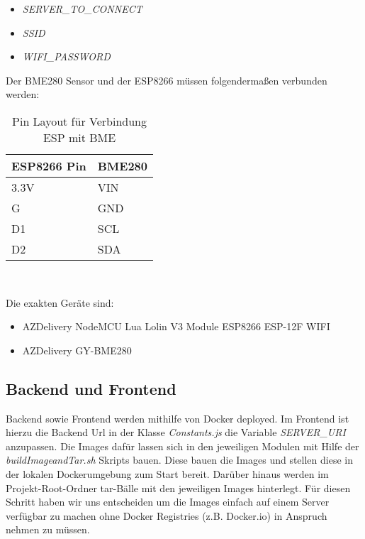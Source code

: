 \begin{itemize}
	\item \textit{SERVER\_TO\_CONNECT}
	\item \textit{SSID}
	\item \textit{WIFI\_PASSWORD}
\end{itemize}

Der BME280 Sensor und der ESP8266 müssen folgendermaßen verbunden werden:

\begin{table}[hbt]
	\centering
	\begin{minipage}[t]{.5\textwidth}
		\caption{Pin Layout für Verbindung ESP mit BME}
	\begin{tabular}{|l|l|}
		\hline
		\textbf{ESP8266 Pin}	& \textbf{BME280}  \\
		\hline
		3.3V & VIN \\
		\hline
		G & GND \\
		\hline
		D1 & SCL \\
		\hline
		D2 & SDA \\
		\hline
	\end{tabular}
	\\
\label{tab:espBmePinout}
\end{minipage}
\end{table}

Die exakten Geräte sind:

\begin{itemize}
	\item AZDelivery NodeMCU Lua Lolin V3 Module ESP8266 ESP-12F WIFI
	\item AZDelivery GY-BME280
\end{itemize}

\subsection{Backend und Frontend}

Backend sowie Frontend werden mithilfe von Docker deployed. Im Frontend ist hierzu die Backend Url in der Klasse \textit{Constants.js} die Variable \textit{SERVER\_URI} anzupassen. Die Images dafür lassen sich in den jeweiligen Modulen mit Hilfe der \textit{buildImageandTar.sh} Skripts bauen. Diese bauen die Images und stellen diese in der lokalen Dockerumgebung zum Start bereit. Darüber hinaus werden im Projekt-Root-Ordner tar-Bälle mit den jeweiligen Images hinterlegt. Für diesen Schritt haben wir uns entscheiden um die Images einfach auf einem Server verfügbar zu machen ohne Docker Registries (z.B. Docker.io) in Anspruch nehmen zu müssen.

